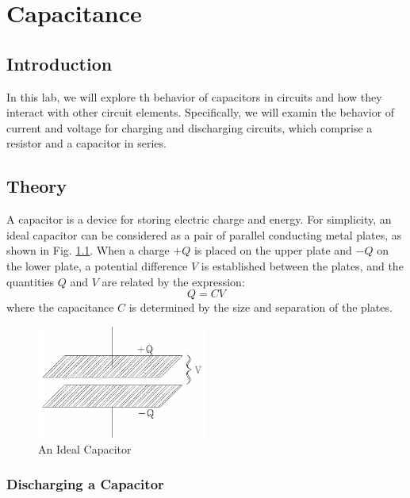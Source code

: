 \chapter{Capacitance}

\section{Introduction}

In this lab, we will explore th behavior of capacitors in circuits and how they interact with other circuit elements. Specifically, we will examin the behavior of current and voltage for charging and discharging  circuits, which comprise a resistor and a capacitor in series.

\section{Theory}

A capacitor is a device for storing electric charge and energy. For simplicity, an ideal capacitor can be considered as a pair of parallel conducting metal plates, as shown in Fig. \ref{fig:capacitor}. When a charge $+Q$ is placed on the upper plate and $-Q$ on the lower plate, a potential difference $V$ is established between the plates, and the quantities $Q$ and $V$ are related by the expression:
\begin{equation}
    Q = CV
\end{equation}
where the capacitance $C$ is determined by the size and separation of the plates.

\begin{figure}[h]
    \begin{center}
        \includegraphics[width=0.5\textwidth]{./Exp4/pic/image1.png}
    \end{center}
    \caption{An Ideal Capacitor}
    \label{fig:capacitor}
\end{figure}

\subsection{Discharging a Capacitor}

